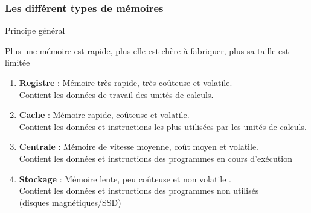 \documentclass[8pt]{beamer}
\begin{document}
\begin{frame}
    \frametitle{Les différent types de mémoires}
    \begin{block}{Principe général}

        Plus une m\'emoire est rapide, plus elle est ch\`ere \`a
        fabriquer, plus sa taille est limit\'ee
    \end{block}
    \begin{enumerate}
        \item \textbf{Registre} : Mémoire très rapide, très coûteuse et
              volatile. \\
              Contient les données de travail des unités de calculs.
        \item \textbf{Cache} : Mémoire rapide, coûteuse et volatile. \\
              Contient les données et instructions les plus utilisées par les
              unités de calculs.
        \item \textbf{Centrale} : Mémoire de vitesse moyenne, coût moyen et
              volatile. \\
              Contient les données et instructions des programmes en cours
              d'exécution
        \item \textbf{Stockage} : Mémoire lente, peu coûteuse et non volatile
              . \\
              Contient les données et instructions des programmes non utilisés
              \\
              (disques magnétiques/SSD)
    \end{enumerate}

\end{frame}
\end{document}
